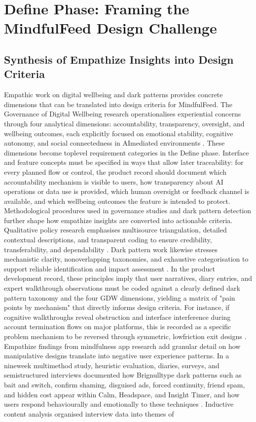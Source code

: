 \documentclass{article}
\begin{document}
\section{Define Phase: Framing the MindfulFeed Design Challenge}

\subsection{Synthesis of Empathize Insights into Design Criteria}
\label{sec:synth_empathize_design_criteria} Empathic work on digital well\-being and dark patterns provides concrete dimensions that can be translated into design criteria for MindfulFeed. The Governance of Digital Well\-being research operationalises experiential concerns through four analytical dimensions: accountability, transparency, oversight, and well\-being outcomes, each explicitly focused on emotional stability, cognitive autonomy, and social connectedness in AI\-mediated environments \parencites[3]{7808872}[8]{7808872}. These dimensions become top\-level requirement categories in the Define phase. Interface and feature concepts must be specified in ways that allow later traceability: for every planned flow or control, the product record should document which accountability mechanism is visible to users, how transparency about AI operations or data use is provided, which human oversight or feedback channel is available, and which well\-being outcomes the feature is intended to protect. Methodological procedures used in governance studies and dark pattern detection further shape how empathize insights are converted into actionable criteria. Qualitative policy research emphasises multi\-source triangulation, detailed contextual descriptions, and transparent coding to ensure credibility, transferability, and dependability \parencites[8]{7808872}. Dark pattern work likewise stresses mechanistic clarity, non\-overlapping taxonomies, and exhaustive categorisation to support reliable identification and impact assessment \parencites[2]{4807303}[3]{4692551}. In the product development record, these principles imply that user narratives, diary entries, and expert walkthrough observations must be coded against a clearly defined dark pattern taxonomy and the four GDW dimensions, yielding a matrix of "pain points by mechanism" that directly informs design criteria. For instance, if cognitive walkthroughs reveal obstruction and interface interference during account termination flows on major platforms, this is recorded as a specific problem mechanism to be reversed through symmetric, low\-friction exit designs \parencites[3]{4692551}[2]{4807303}. Empathize findings from mindfulness app research add granular detail on how manipulative designs translate into negative user experience patterns. In a nine\-week multi\-method study, heuristic evaluation, diaries, surveys, and semi\-structured interviews documented how Brignull\-type dark patterns such as bait and switch, confirm shaming, disguised ads, forced continuity, friend spam, and hidden cost appear within Calm, Headspace, and Insight Timer, and how users respond behaviourally and emotionally to these techniques \parencites[2]{7173856}. Inductive content analysis organised interview data into themes of 
\end{document}
